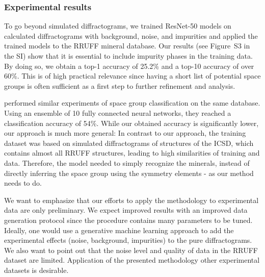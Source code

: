     \subsubsection*{Experimental results}
    To go beyond simulated diffractograms, we trained ResNet-50 models on
    calculated diffractograms with background, noise, and impurities and applied
    the trained models to the RRUFF mineral database. Our results (see Figure~S3
    in the SI) show that it is essential to include impurity phases in the
    training data. By doing so, we obtain a top-1 accuracy of 25.2\% and a
    top-10 accuracy of over 60\%. This is of high practical relevance since
    having a short list of potential space groups is often sufficient as a first
    step to further refinement and analysis.

    \citeauthor{vecseiNeuralNetworkBased2019} performed similar experiments of
    space group classification on the same database. Using an ensemble of 10
    fully connected neural networks, they reached a classification accuracy of
    54\%\supercite{vecseiNeuralNetworkBased2019}. While our obtained accuracy is
    significantly lower, our approach is much more general: In contrast to our
    approach, the training dataset was based on simulated diffractograms of
    structures of the ICSD\supercite{vecseiNeuralNetworkBased2019}, which
    contains almost all RRUFF structures, leading to high similarities of
    training and  data. Therefore, the model needed to
    simply recognize the minerals, instead of directly inferring the space group
    using the symmetry elements - as our method needs to do.

    We want to emphasize that our efforts to apply the methodology to
    experimental data are only preliminary. We expect improved results with an
    improved data generation protocol since the procedure contains many
    parameters to be tuned. Ideally, one would use a generative machine learning
    approach to add the experimental effects (noise, background, impurities) to
    the pure diffractograms. We also want to point out that the noise level and
    quality of data in the RRUFF dataset are limited. Application of the
    presented methodology  other experimental datasets is
    desirable. 
    
